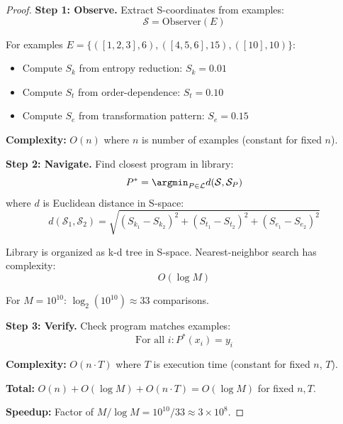 \documentclass[twocolumn,10pt]{article}
\theoremstyle{definition}
\theoremstyle{remark}
\newcommand{\Sk}{S_k}
\newcommand{\St}{S_t}
\newcommand{\Se}{S_e}
\newcommand{\Sspace}{\mathcal{S}}
\begin{document}
\begin{proof}
\textbf{Step 1: Observe.} Extract S-coordinates from examples:
\begin{equation}
\Sspace = \text{Observer}(E)
\end{equation}

For examples $E = \{([1,2,3], 6), ([4,5,6], 15), ([10], 10)\}$:
\begin{itemize}
\item Compute $\Sk$ from entropy reduction: $\Sk = 0.01$
\item Compute $\St$ from order-dependence: $\St = 0.10$
\item Compute $\Se$ from transformation pattern: $\Se = 0.15$
\end{itemize}

\textbf{Complexity:} $O(n)$ where $n$ is number of examples (constant for fixed $n$).

\vspace{0.2cm}
\noindent\textbf{Step 2: Navigate.} Find closest program in library:
\begin{equation}
P^* = \argmin_{P \in \mathcal{L}} d(\Sspace, \Sspace_P)
\end{equation}
where $d$ is Euclidean distance in S-space:
\begin{equation}
d(\Sspace_1, \Sspace_2) = \sqrt{(\Sk_1 - \Sk_2)^2 + (\St_1 - \St_2)^2 + (\Se_1 - \Se_2)^2}
\end{equation}

Library is organized as k-d tree in S-space. Nearest-neighbor search has complexity:
\begin{equation}
O(\log M)
\end{equation}

For $M = 10^{10}$: $\log_2(10^{10}) \approx 33$ comparisons.

\vspace{0.2cm}
\noindent\textbf{Step 3: Verify.} Check program matches examples:
\begin{equation}
\text{For all } i: P^*(x_i) = y_i
\end{equation}

\textbf{Complexity:} $O(n \cdot T)$ where $T$ is execution time (constant for fixed $n$, $T$).

\vspace{0.2cm}
\noindent\textbf{Total:} $O(n) + O(\log M) + O(n \cdot T) = O(\log M)$ for fixed $n, T$.

\textbf{Speedup:} Factor of $M/\log M = 10^{10}/33 \approx 3 \times 10^8$.
\end{proof}
\end{document}
